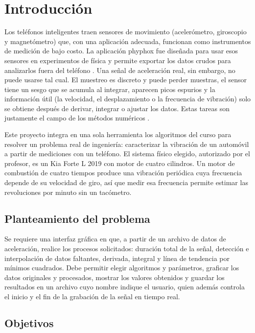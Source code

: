 \section{Introducción}

Los teléfonos inteligentes traen sensores de movimiento (acelerómetro, giroscopio y magnetómetro) que, con una aplicación adecuada, funcionan como instrumentos de medición de bajo costo. La aplicación phyphox fue diseñada para usar esos sensores en experimentos de física y permite exportar los datos crudos para analizarlos fuera del teléfono \parencite{staacks2018}. Una señal de aceleración real, sin embargo, no puede usarse tal cual. El muestreo es discreto y puede perder muestras, el sensor tiene un sesgo que se acumula al integrar, aparecen picos espurios y la información útil (la velocidad, el desplazamiento o la frecuencia de vibración) solo se obtiene después de derivar, integrar o ajustar los datos. Estas tareas son justamente el campo de los métodos numéricos \parencite{chapra2015}.

Este proyecto integra en una sola herramienta los algoritmos del curso para resolver un problema real de ingeniería: caracterizar la vibración de un automóvil a partir de mediciones con un teléfono. El sistema físico elegido, autorizado por el profesor, es un Kia Forte L 2019 con motor de cuatro cilindros. Un motor de combustión de cuatro tiempos produce una vibración periódica cuya frecuencia depende de su velocidad de giro, así que medir esa frecuencia permite estimar las revoluciones por minuto sin un tacómetro.

\subsection{Planteamiento del problema}

Se requiere una interfaz gráfica en \matlab{} que, a partir de un archivo de datos de aceleración, realice los procesos solicitados: duración total de la señal, detección e interpolación de datos faltantes, derivada, integral y línea de tendencia por mínimos cuadrados. Debe permitir elegir algoritmos y parámetros, graficar los datos originales y procesados, mostrar los valores obtenidos y guardar los resultados en un archivo cuyo nombre indique el usuario, quien además controla el inicio y el fin de la grabación de la señal en tiempo real.

\subsection{Objetivos}

